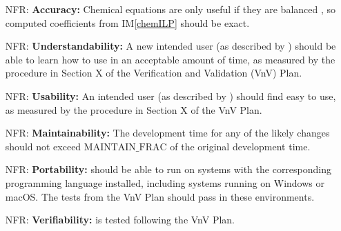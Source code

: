 \documentclass[12pt]{article}
\newcommand{\imref}[1]{IM\ref{#1}}
\newcounter{nfrnum} %
\begin{document}
\begin{itemize}

  \item[NFR\refstepcounter{nfrnum}\thenfrnum \label{NFR_accuracy}:]
    \textbf{Accuracy:} Chemical equations are only useful if they are balanced
    \cite{lund_introduction_2023}, so computed coefficients from \imref{chemILP}
    should be exact.



  \item[NFR\refstepcounter{nfrnum}\thenfrnum \label{NFR_understandability}:]
    \textbf{Understandability:} A new intended user (as described by
    ) should be able to learn how to use \progname{} in an
    acceptable amount of time, as measured by the procedure in Section X of
    the Verification and Validation (VnV) Plan.

  \item[NFR\refstepcounter{nfrnum}\thenfrnum \label{NFR_usability}:]
    \textbf{Usability:} An intended user (as described by )
    should find \progname{} easy to use, as measured by the procedure in Section X
    of the VnV Plan.

  \item[NFR\refstepcounter{nfrnum}\thenfrnum \label{NFR_maintainability}:]
    \textbf{Maintainability:} The development time for any of the likely
    changes should not exceed $\text{MAINTAIN\_FRAC}$ of the original
    development time.

  \item[NFR\refstepcounter{nfrnum}\thenfrnum \label{NFR_portability}:]
    \textbf{Portability:} \progname{} should be able to run on systems with the
    corresponding programming language
    installed, including systems running on Windows or macOS. The tests from
    the VnV Plan should pass in these environments.

  \item[NFR\refstepcounter{nfrnum}\thenfrnum \label{NFR_verifiability}:]
    \textbf{Verifiability:} \progname{} is tested following the VnV Plan.


\end{itemize}
\end{document}

